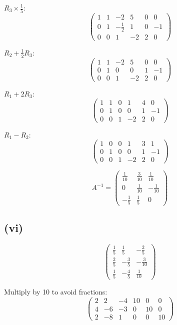 \documentclass[12pt]{article}
\begin{document}
$R_3 \times \frac{1}{5}$:
\[
	\begin{pmatrix}
		1 & 1 & -2           & 5  & 0 & 0  \\
		0 & 1 & -\frac{1}{2} & 1  & 0 & -1 \\
		0 & 0 & 1            & -2 & 2 & 0
	\end{pmatrix}
\]

$R_2 + \frac{1}{2}R_3$:
\[
	\begin{pmatrix}
		1 & 1 & -2 & 5  & 0 & 0  \\
		0 & 1 & 0 & 0  & 1 & -1 \\
		0 & 0 & 1 & -2 & 2 & 0
	\end{pmatrix}
\]

$R_1 + 2R_3$:
\[
	\begin{pmatrix}
		1 & 1 & 0 & 1  & 4 & 0  \\
		0 & 1 & 0 & 0  & 1 & -1 \\
		0 & 0 & 1 & -2 & 2 & 0
	\end{pmatrix}
\]

$R_1 - R_2$:
\[
	\begin{pmatrix}
		1 & 0 & 0 & 1  & 3 & 1  \\
		0 & 1 & 0 & 0  & 1 & -1 \\
		0 & 0 & 1 & -2 & 2 & 0
	\end{pmatrix}
\]

\[
	A^{-1} = \begin{pmatrix}
		\frac{1}{10} & \frac{3}{10} & \frac{1}{10}  \\
		0            & \frac{1}{10} & -\frac{1}{10} \\
		-\frac{1}{5} & \frac{1}{5}  & 0
	\end{pmatrix}
\]

\subsection*{(vi)}
\[
	\begin{pmatrix}
		\frac{1}{5} & \frac{1}{5}  & -\frac{2}{5}  \\
		\frac{2}{5} & -\frac{3}{5} & -\frac{3}{10} \\
		\frac{1}{5} & -\frac{4}{5} & \frac{1}{10}
	\end{pmatrix}
\]

Multiply by 10 to avoid fractions:
\[
	\begin{pmatrix}
		2 & 2  & -4 & 10 & 0  & 0  \\
		4 & -6 & -3 & 0  & 10 & 0  \\
		2 & -8 & 1  & 0  & 0  & 10
	\end{pmatrix}
\]
\end{document}
